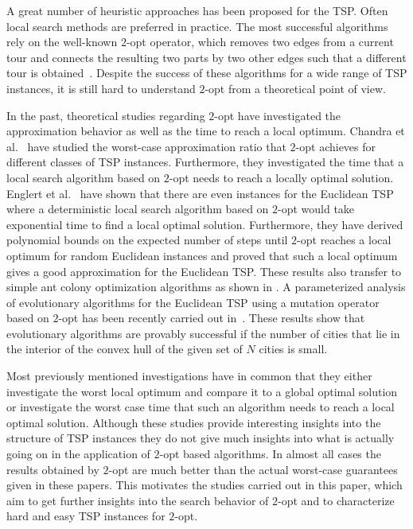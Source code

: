 \documentclass{article}
\begin{document}
A great number of heuristic approaches has been proposed for the
TSP. Often local search methods are preferred in
practice. The most successful algorithms rely on the well-known
$2$-opt operator, which removes two edges from a current tour and
connects the resulting two parts by two other edges such that a
different tour is obtained~\cite{JohnsonG97}. Despite the success of
these algorithms for a wide range of TSP instances, it is still hard
to understand $2$-opt from a theoretical point of view.

In the past, theoretical studies regarding $2$-opt have investigated
the approximation behavior as well as the time to reach a local
optimum.  Chandra et al.~\cite{ChandraKT99} have studied the
worst-case approximation ratio that $2$-opt achieves for different
classes of TSP instances. Furthermore, they investigated the time that
a local search algorithm based on $2$-opt needs to reach a locally
optimal solution.  Englert et al.~\cite{EnglertRV07} have shown that
there are even instances for the Euclidean TSP where a deterministic
local search algorithm based on $2$-opt would take exponential time to
find a local optimal solution. Furthermore, they have derived polynomial
bounds on the expected number of steps until $2$-opt reaches a local
optimum for random Euclidean instances and proved that such a local
optimum gives a good approximation for the Euclidean TSP. These
results also transfer to simple ant colony optimization algorithms as
shown in \cite{AntsTsp10}.  A parameterized analysis of evolutionary
algorithms for the Euclidean TSP using a mutation operator based on
$2$-opt has been recently carried out in~\cite{TSPAAAI12}. These
results show that evolutionary algorithms are provably successful if
the number of cities that lie in the interior of the convex hull of
the given set of $N$ cities is small.

Most previously mentioned investigations have in common that they
either investigate the worst local optimum and compare it to a global
optimal solution or investigate the worst case time that such an
algorithm needs to reach a local optimal solution. Although these
studies provide interesting insights into the structure of TSP
instances they do not give much insights into what is actually
going on in the application of $2$-opt based algorithms. In almost all
cases the results obtained by $2$-opt are much better than the actual
worst-case guarantees given in these papers. This motivates the
studies carried out in this paper, which aim to get further insights
into the search behavior of $2$-opt and to characterize hard and easy
TSP instances for $2$-opt.
\end{document}
